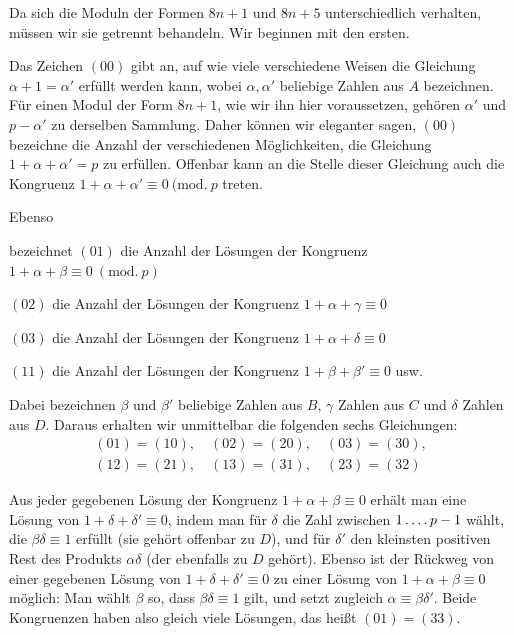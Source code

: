 Da sich die Moduln der Formen $8n+1$ und $8n+5$ unterschiedlich verhalten, müssen wir sie getrennt behandeln. Wir beginnen mit den ersten.

Das Zeichen $(00)$ gibt an, auf wie viele verschiedene Weisen die Gleichung $\alpha+1=\alpha'$ erfüllt werden kann, wobei $\alpha,\alpha'$ beliebige Zahlen aus $A$ bezeichnen. Für einen Modul der Form $8n+1$, wie wir ihn hier voraussetzen, gehören $\alpha'$ und $p-\alpha'$ zu derselben Sammlung. Daher können wir eleganter sagen, $(00)$ bezeichne die Anzahl der verschiedenen Möglichkeiten, die Gleichung $1+\alpha+\alpha'=p$ zu erfüllen. Offenbar kann an die Stelle dieser Gleichung auch die Kongruenz $1+\alpha+\alpha'\equiv0\ (\mathrm{mod.}\ p$ treten.

Ebenso
\begin{center}
\begin{minipage}{\linewidth}
bezeichnet $(01)$ die Anzahl der Lösungen der Kongruenz $1+\alpha+\beta\equiv0\ (\mathrm{mod.}\ p)$\par
$(02)$ die Anzahl der Lösungen der Kongruenz $1+\alpha+\gamma\equiv0$\par
$(03)$ die Anzahl der Lösungen der Kongruenz $1+\alpha+\delta\equiv0$\par
$(11)$ die Anzahl der Lösungen der Kongruenz $1+\beta+\beta'\equiv0$ usw.
\end{minipage}
\end{center}
Dabei bezeichnen $\beta$ und $\beta'$ beliebige Zahlen aus $B$, $\gamma$ Zahlen aus $C$ und $\delta$ Zahlen aus $D$. Daraus erhalten wir unmittelbar die folgenden sechs Gleichungen:
\[
\begin{gathered}
(01)=(10),\quad(02)=(20),\quad(03)=(30),\\
(12)=(21),\quad(13)=(31),\quad(23)=(32)
\end{gathered}
\]

Aus jeder gegebenen Lösung der Kongruenz $1+\alpha+\beta\equiv0$ erhält man eine Lösung von $1+\delta+\delta'\equiv0$, indem man für $\delta$ die Zahl zwischen $1\mathinner{.\,.\,.\,.} p-1$\space%
%
wählt, die $\beta\delta\equiv1$ erfüllt (sie gehört offenbar zu $D$), und für $\delta'$ den kleinsten positiven Rest des Produkts $\alpha\delta$ (der ebenfalls zu $D$ gehört). Ebenso ist der Rückweg von einer gegebenen Lösung von $1+\delta+\delta'\equiv0$ zu einer Lösung von $1+\alpha+\beta\equiv0$ möglich: Man wählt $\beta$ so, dass $\beta\delta\equiv1$ gilt, und setzt zugleich $\alpha\equiv\beta\delta'$. Beide Kongruenzen haben also gleich viele Lösungen, das heißt $(01)=(33)$.


